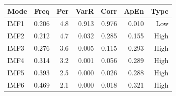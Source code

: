 {\tiny\setlength{\tabcolsep}{1pt}\begin{tabular}{lrrrrrr} \toprule
Mode & Freq & Per & VarR & Corr & ApEn & Type \\ \midrule
IMF1 & 0.206 & 4.8 & 0.913 & 0.976 & 0.010 & Low \\ 
IMF2 & 0.212 & 4.7 & 0.032 & 0.285 & 0.155 & High \\ 
IMF3 & 0.276 & 3.6 & 0.005 & 0.115 & 0.293 & High \\ 
IMF4 & 0.314 & 3.2 & 0.001 & 0.056 & 0.289 & High \\ 
IMF5 & 0.393 & 2.5 & 0.000 & 0.026 & 0.288 & High \\ 
IMF6 & 0.469 & 2.1 & 0.000 & 0.018 & 0.321 & High \\ 
\bottomrule \end{tabular}}